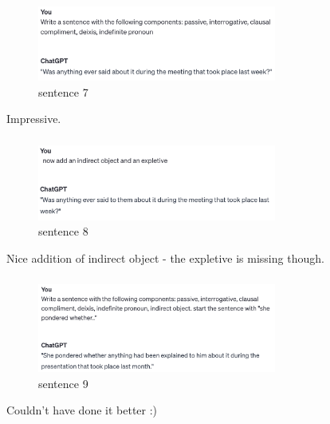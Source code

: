 \documentclass{article}
\begin{document}
\subsubsection{}	%
\begin{figure}[H]
  \centering
  \includegraphics[width=0.7\textwidth]{2sen7.png} 
  \caption{sentence 7}
\end{figure}
Impressive. 

\subsubsection{}	%
\begin{figure}[H]
  \centering
  \includegraphics[width=0.7\textwidth]{2sen8.png} 
  \caption{sentence 8}
\end{figure}
Nice addition of indirect object - the expletive is missing though. 

\subsubsection{}	%
\begin{figure}[H]
  \centering
  \includegraphics[width=0.7\textwidth]{2sen9.png} 
  \caption{sentence 9}
\end{figure}
Couldn't have done it better :)

\subsection{}		%
\end{document}
